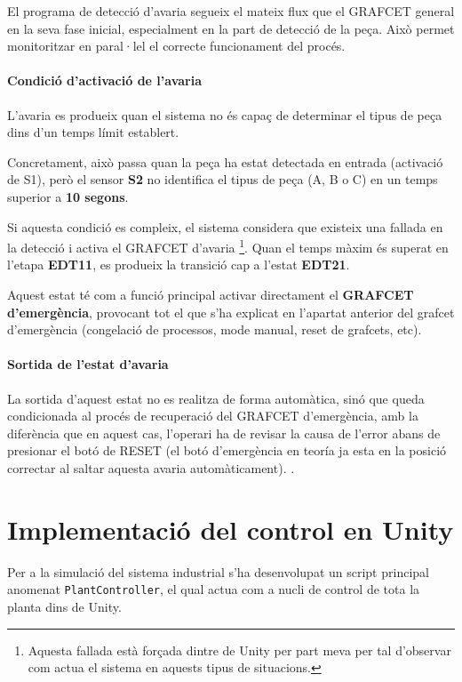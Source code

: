\documentclass[12pt,a4paper]{report}
\begin{document}
El programa de detecció d'avaria segueix el mateix flux que el GRAFCET general en la seva fase inicial, especialment en la part de detecció de la peça. Això permet monitoritzar en paral·lel el correcte funcionament del procés.

\paragraph{Condició d'activació de l'avaria}

L'avaria es produeix quan el sistema no és capaç de determinar el tipus de peça dins d'un temps límit establert.

Concretament, això passa quan la peça ha estat detectada en entrada (activació de S1), però el sensor \textbf{S2} no identifica el tipus de peça (A, B o C) en un temps superior a \textbf{10 segons}.

Si aquesta condició es compleix, el sistema considera que existeix una fallada en la detecció i activa el GRAFCET d'avaria \footnote{Aquesta fallada està forçada dintre de Unity per part meva per tal d'observar com actua el sistema en aquests tipus de situacions.}.  Quan el temps màxim és superat en l'etapa \textbf{EDT11}, es produeix la transició cap a l'estat \textbf{EDT21}.



Aquest estat té com a funció principal activar directament el \textbf{GRAFCET d'emergència}, provocant tot el que s'ha explicat en l'apartat anterior del grafcet d'emergència (congelació de processos, mode manual, reset de grafcets, etc).

\paragraph{Sortida de l'estat d'avaria}

La sortida d'aquest estat no es realitza de forma automàtica, sinó que queda condicionada al procés de recuperació del GRAFCET d'emergència, amb la diferència que en aquest cas, l'operari ha de revisar la causa de l'error abans de presionar el botó de RESET (el botó d'emergència en teoría ja esta en la posició correctar al saltar aquesta avaria automàticament). .






\section{Implementació del control en Unity}
Per a la simulació del sistema industrial s'ha desenvolupat un script principal anomenat \texttt{PlantController}, el qual actua com a nucli de control de tota la planta dins de Unity.
\end{document}

